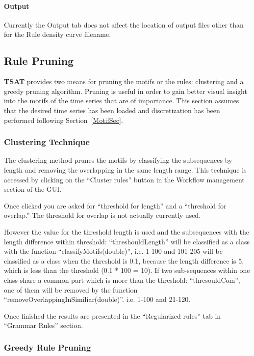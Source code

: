 \documentclass[titlepage, letterpaper, 12pt]{article}
\newcommand\TSAT{\textbf{TSAT}}
\begin{document}
\paragraph{Output}
Currently the Output tab does not affect the location of output files other than for the Rule density curve filename. 


\subsection{Rule Pruning}

{\TSAT} provides two means for pruning the motifs or the rules: clustering and a greedy pruning algorithm.  Pruning is useful in order to gain better visual insight into the motifs of the time series that are of importance.  This section assumes that the desired time series has been loaded and discretization has been performed following Section~\ref{MotifSec}.

\subsubsection{Clustering Technique}

The clustering method prunes the motifs by classifying the subsequences by length and removing the overlapping in the same length range. This technique is accessed by clicking on the ``Cluster rules'' button in the Workflow management section of the GUI.

Once clicked you are asked for ``threshold for length'' and a ``threshold for overlap.''  The threshold for overlap is not actually currently used.

However the value for the threshold length is used and the subsequences with the length difference within threshold: ``threshouldLength'' will be classified as a class with the function ``classifyMotifs(double)'', i.e. 1-100 and 101-205 will be classified as a class when the threshold is 0.1, because the length difference is 5, which is less than the threshold (0.1 * 100 = 10). If two sub-sequences within one class share a common part which is more than the threshold: ``thresouldCom'', one of them will be removed by the function ``removeOverlappingInSimiliar(double)''. i.e. 1-100 and 21-120.

Once finished the results are presented in the ``Regularized rules'' tab in ``Grammar Rules'' section.

\subsubsection{Greedy Rule Pruning}
\end{document}
